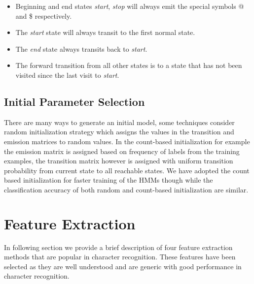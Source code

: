 \documentclass[runningheads]{llncs}
\begin{document}
\begin{itemize}
 \item Beginning and end states \textit{start}, \textit{stop} will always emit the special symbols @ and \$ respectively.
 \item The  \textit{start} state will always transit to the first normal state.
 \item The \textit{end} state always transits back to \textit{start}.
 \item The forward transition from all other states is to a state that has not been visited since the last visit to \textit{start}.
\end{itemize}

\subsection{Initial Parameter Selection}
\label{ssec:init}
There are many ways to generate an initial model, some techniques consider random initialization strategy which assigns the values in the transition and emission matrices to random values. In the count-based initialization for example the emission matrix is assigned based on frequency of labels from the training examples, the transition matrix however is assigned with uniform transition probability from current state to all reachable states. We have adopted the count based initialization for faster training of the HMMs \cite{Laan} though while the classification accuracy of both random and count-based initialization are similar.


\section{Feature Extraction}
\label{sec:feat}
In following section we provide a brief description of four feature extraction methods that are popular in character recognition. These features have been selected as they are well understood and are generic with good performance in character recognition.
\end{document}
